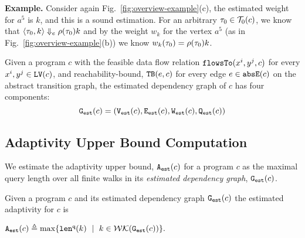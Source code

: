 \textbf{Example.} 
Consider again
Fig.~\ref{fig:overview-example}(c),
the estimated weight for $a^5$ is $k$, and this is a sound estimation.
For an arbitrary $\mathtt{\tau}_0 \in \mathcal{T}_0(c)$, we know that $\langle \mathtt{\tau}_0, k \rangle \Downarrow_e \rho(\mathtt{\tau}_0) k$ and
by the weight $w_k$ for the vertex $a^5$ (as in Fig.~\ref{fig:overview-example}(b)) we know 
$w_k(\mathtt{\tau}_0) = \rho(\mathtt{\tau}_0) k$.
%

\begin{defn}
  \label{def:prog_graph}
  Given a program $c$ 
  with the feasible data flow relation $\mathtt{flowsTo}(x^i, y^j, c)$ for every $x^i, y^j \in \mathtt{LV}(c)$, 
  and reachability-bound, ${\mathtt{TB}}(e, c)$ for every edge $e \in \mathtt{abs}{\mathtt{E}}(c)$ on the abstract transition graph,
  the estimated dependency graph of $c$ has four components:
  \[\mathtt{{G_{est}}}(c) = (\mathtt{{V_{est}}}(c), \mathtt{{E_{est}}}(c), \mathtt{{W_{est}}}(c), \mathtt{{Q_{est}}}(c))\]
\end{defn}

\subsection{Adaptivity Upper Bound Computation}
\label{sec:alg_adaptcompute}
We estimate the adaptivity upper bound, 
${\mathtt{A_{est}}}(c)$ for a program $c$ as the maximal query length over all finite walks 
in its \emph{estimated dependency graph}, $\mathtt{{G_{est}}}({c})$.
%

\begin{defn}
\label{def:prog_adapt}
{
Given a program ${c}$ and its estimated dependency graph 
$\mathtt{{G_{est}}}({c})$
the estimated adaptivity for $c$ is 
\begin{center}
$
\progA({c})
\triangleq \max
\left\{ \qlen(k) \ \mid \  k \in \walks(\progG(c))\right \}.
$
\end{center}
}
\end{defn}

